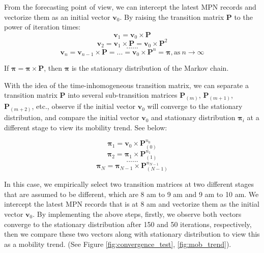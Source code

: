\documentclass[12pt]{article}
\theoremstyle{definition}
\begin{document}
From the forecasting point of view, we can intercept the latest MPN records and vectorize them as an initial vector \(\boldsymbol{v}_{0}\). By raising the transition matrix \textbf{P} to the power of iteration times:
\begin{equation*}
    \boldsymbol{v}_{1}=\boldsymbol{v}_{0} \times \textbf{P}
\end{equation*}
\begin{equation*}
   \boldsymbol{v}_{2}=\boldsymbol{v}_{1} \times \textbf{P}=\boldsymbol{v}_{0} \times \textbf{P}^{2}
\end{equation*}
\begin{equation*}
   ......
\end{equation*}
\begin{equation*}
   \boldsymbol{v}_{n}=\boldsymbol{v}_{n-1} \times \textbf{P}=...=\boldsymbol{v}_{0} \times \textbf{P}^{n}=\boldsymbol{\pi}, \text{as} \: n \to \infty
\end{equation*}

If \(\boldsymbol{\pi}=\boldsymbol{\pi} \times \textbf{P}\), then \(\boldsymbol{\pi}\) is the stationary distribution of the Markov chain.


With the idea of the time-inhomogeneous transition matrix, we can separate a transition matrix \textbf{P} into several sub-transition matrices \(\textbf{P}_{(m)}\), \(\textbf{P}_{(m+1)}\), \(\textbf{P}_{(m+2)}\), etc., observe if the initial vector \(\boldsymbol{v}_{0}\) will converge to the stationary distribution, and compare the initial vector \(\boldsymbol{v}_{0}\) and stationary distribution \(\boldsymbol{\pi}_{i}\)  at a different stage to view its mobility trend. See below:

\begin{equation*}
    \boldsymbol{\pi}_{1}=\boldsymbol{v}_{0} \times \textbf{P}_{(0)}^{n_{0}}
\end{equation*}
\begin{equation*}
   \boldsymbol{\pi}_{2}=\boldsymbol{\pi}_{1} \times \textbf{P}_{(1)}^{n_{1}}
\end{equation*}
\begin{equation*}
   ......
\end{equation*}
\begin{equation*}
   \boldsymbol{\pi}_{N}=\boldsymbol{\pi}_{N-1} \times \textbf{P}_{(N-1)}^{n_{N-1}}
\end{equation*}

In this case, we empirically select two transition matrices at two different stages that are assumed to be different, which are 8 am to 9 am and 9 am to 10 am. We intercept the latest MPN records that is at 8 am and vectorize them as the initial vector \(\boldsymbol{v}_{0}\). By implementing the above steps, firstly, we observe both vectors converge to the stationary distribution after 150 and 50 iterations, respectively, then we compare these two vectors along with stationary distribution to view this as a mobility trend. (See Figure \ref{fig:convergence_test}, \ref{fig:mob_trend}).
\end{document}
